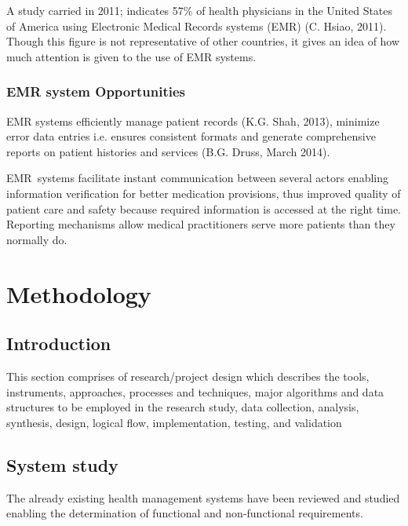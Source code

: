 \documentclass[12pt]{article}
\begin{document}
A study carried in 2011; indicates 57$\%$  of health physicians in the United States of America using Electronic Medical Records systems (EMR)  (C. Hsiao, 2011). Though this figure is not representative of other countries, it gives an idea of how much attention is given to the use of EMR systems.\par

\subsubsection*{EMR system Opportunities}
EMR systems efficiently manage patient records  (K.G. Shah, 2013), minimize error data entries i.e. ensures consistent formats and generate comprehensive reports on patient histories and services  (B.G. Druss, March 2014).\par

EMR\ systems facilitate instant communication between several actors enabling information verification for better medication provisions, thus improved quality of patient care  and safety because required information is accessed at the right time. Reporting mechanisms allow medical practitioners serve more patients than they normally do.\par

\section{Methodology}
\setlength{\parskip}{3.0pt}
\subsection*{Introduction \hspace*{10pt}}
\setlength{\parskip}{8.04pt}
This section comprises of research/project design which describes the tools, instruments, approaches, processes and techniques, major algorithms and data structures to be employed in the research study, data collection, analysis, synthesis, design, logical flow, implementation, testing, and validation\par

\setlength{\parskip}{3.0pt}
\subsection*{System study}
\setlength{\parskip}{8.04pt}
The already existing health management systems have been reviewed and studied enabling the determination of functional and non-functional requirements. \par
\end{document}
